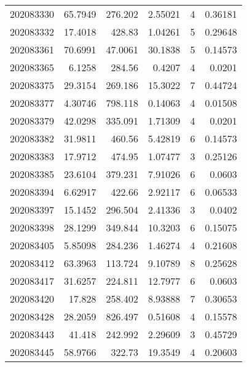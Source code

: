\begin{tabular}{rrrrrr}
 202083330 &         65.7949  &      276.202  &            2.55021 &           4 & 0.36181 \\
 202083332 &         17.4018  &      428.83   &            1.04261 &           5 & 0.29648 \\
 202083361 &         70.6991  &       47.0061 &           30.1838  &           5 & 0.14573 \\
 202083365 &          6.1258  &      284.56   &            0.4207  &           4 & 0.0201  \\
 202083375 &         29.3154  &      269.186  &           15.3022  &           7 & 0.44724 \\
 202083377 &          4.30746 &      798.118  &            0.14063 &           4 & 0.01508 \\
 202083379 &         42.0298  &      335.091  &            1.71309 &           4 & 0.0201  \\
 202083382 &         31.9811  &      460.56   &            5.42819 &           6 & 0.14573 \\
 202083383 &         17.9712  &      474.95   &            1.07477 &           3 & 0.25126 \\
 202083385 &         23.6104  &      379.231  &            7.91026 &           6 & 0.0603  \\
 202083394 &          6.62917 &      422.66   &            2.92117 &           6 & 0.06533 \\
 202083397 &         15.1452  &      296.504  &            2.41336 &           3 & 0.0402  \\
 202083398 &         28.1299  &      349.844  &           10.3203  &           6 & 0.15075 \\
 202083405 &          5.85098 &      284.236  &            1.46274 &           4 & 0.21608 \\
 202083412 &         63.3963  &      113.724  &            9.10789 &           8 & 0.25628 \\
 202083417 &         31.6257  &      224.811  &           12.7977  &           6 & 0.0603  \\
 202083420 &         17.828   &      258.402  &            8.93888 &           7 & 0.30653 \\
 202083428 &         28.2059  &      826.497  &            0.51608 &           4 & 0.15578 \\
 202083443 &         41.418   &      242.992  &            2.29609 &           3 & 0.45729 \\
 202083445 &         58.9766  &      322.73   &           19.3549  &           4 & 0.20603 \\

\end{tabular}
